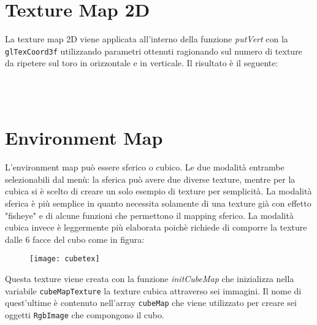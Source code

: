 \section{Texture Map 2D}
La texture map 2D viene applicata all'interno della funzione \textit{putVert} con la \texttt{glTexCoord3f} utilizzando parametri ottenuti ragionando sul numero di texture da ripetere sul toro in orizzontale e in verticale. Il risultato è il seguente:

\begin{figure}[hbt]
    \centering
    \\
    \\
	\vspace{-0.5cm}
\end{figure}

\newpage
\section{Environment Map}
L'environment map può essere sferico o cubico. Le due modalità entrambe selezionabili dal menù: la sferica può avere due diverse texture, mentre per la cubica si è scelto di creare un solo esempio di texture per semplicità. La modalità sferica è più semplice in quanto necessita solamente di una texture già con effetto "fisheye" e di alcune funzioni che permettono il mapping sferico. La modalità cubica invece è leggermente più elaborata poichè richiede di comporre la texture dalle 6 facce del cubo come in figura:\\
 \begin{figure}[htb]
    \centering
    \texttt{[image: cubetex]}
    \caption*{\label{fig:cubetex}}
    \vspace{-0.7cm}
\end{figure}

Questa texture viene creata con la funzione \textit{initCubeMap} che inizializza nella variabile \texttt{cubeMapTexture} la texture cubica attraverso sei immagini. Il nome di quest'ultime è contenuto nell'array \texttt{cubeMap} che viene utilizzato per creare sei oggetti \texttt{RgbImage} che compongono il cubo.\\

